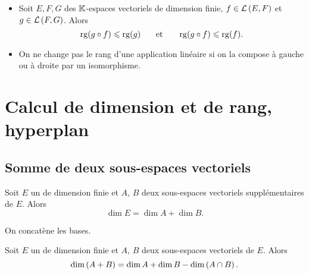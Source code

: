 \documentclass{magnolia}
\begin{document}
\begin{proposition}
\begin{itemize}
\item Soit $E, F, G$ des $\mathbb{K}$-espaces vectoriels de dimension finie, $f\in\mathcal{L}\left(E,F\right)$ et
  $g\in\mathcal{L}\left(F,G\right)$. Alors
  \[\operatorname{rg}(g\circ f)\leqslant\operatorname{rg}(g) \quad\quad\!\text{et}\quad\!\quad \operatorname{rg}(g\circ f)\leqslant\operatorname{rg}(f).\]
\item On ne change pas le rang d'une application linéaire si on la compose à gauche ou à
  droite par un isomorphisme.
\end{itemize}
\end{proposition}

\section{Calcul de dimension et de rang, hyperplan}

\subsection{Somme de deux sous-espaces vectoriels}


\begin{proposition}[utile=2]
Soit $E$ un \Kev de dimension finie et $A$, $B$ deux sous-espaces
vectoriels supplémentaires de $E$. Alors
\[\dim E=\dim A+\dim B.\]
\end{proposition}

\begin{preuve}
On concatène les bases.
\end{preuve}


\begin{proposition}[nom={Formule de \nom{Grassmann}}]
Soit $E$ un \Kev de dimension finie et $A$, $B$ deux sous-espaces vectoriels
de $E$. Alors
\[\dim\left(A+B\right)=\dim A+\dim B-\dim\left(A\cap B\right).\]
\end{proposition}
\end{document}
